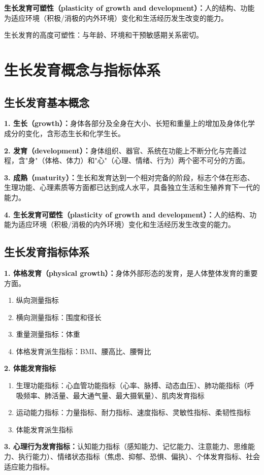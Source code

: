 \begin{defbox}
\textbf{生长发育可塑性（plasticity of growth and development）：}人的结构、功能为适应环境（积极/消极的内外环境）变化和生活经历发生改变的能力。

生长发育的高度可塑性：与年龄、环境和干预敏感期关系密切。
\end{defbox}

\section{生长发育概念与指标体系}

\subsection{生长发育基本概念}

\begin{defbox}
\textbf{1. 生长（growth）：}身体各部分及全身在大小、长短和重量上的增加及身体化学成分的变化，含形态生长和化学生长。

\textbf{2. 发育（development）：}身体组织、器官、系统在功能上不断分化与完善过程，含"身"（体格、体力）和"心"（心理、情绪、行为）两个密不可分的方面。

\textbf{3. 成熟（maturity）：}生长和发育达到一个相对完备的阶段，标志个体在形态、生理功能、心理素质等方面都已达到成人水平，具备独立生活和生殖养育下一代的能力。

\textbf{4. 生长发育可塑性（plasticity of growth and development）：}人的结构、功能为适应环境（积极/消极的内外环境）变化和生活经历发生改变的能力。
\end{defbox}

\subsection{生长发育指标体系}

\begin{keybox}
\textbf{1. 体格发育（physical growth）：}身体外部形态的发育，是人体整体发育的重要方面。
\begin{enumerate}[leftmargin=*]
    \item 纵向测量指标
    \item 横向测量指标：围度和径长
    \item 重量测量指标：体重
    \item 体格发育派生指标：BMI、腰高比、腰臀比
\end{enumerate}

\textbf{2. 体能发育指标}
\begin{enumerate}[leftmargin=*]
    \item 生理功能指标：心血管功能指标（心率、脉搏、动态血压）、肺功能指标（呼吸频率、肺活量、最大通气量、最大摄氧量）、肌肉发育指标
    \item 运动能力指标：力量指标、耐力指标、速度指标、灵敏性指标、柔韧性指标
    \item 体能发育派生指标
\end{enumerate}

\textbf{3. 心理行为发育指标：}认知能力指标（感知能力、记忆能力、注意能力、思维能力、执行能力）、情绪状态指标（焦虑、抑郁、恐惧、偏执）、个体发育指标、社会适应能力指标。
\end{keybox}

